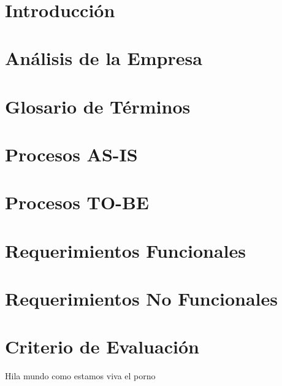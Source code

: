 \documentclass[10pt]{book}
\author{Cédula de Análisis de la OEDP}
\title{\varProyecto}
\subtitle {\varCveDocumento--\varDocumento}
\begin{document}
    \thispagestyle{empty}
    \maketitle

    \makeDocInfo
    \bigskip\\
    \makeObservaciones[3cm]
    \vspace{2cm}
    \makeFirmas

    \frontmatter
    \tableofcontents
    \listoffigures
    \mainmatter
    
    
    \chapter{Introducción}
    
    
    \chapter{Análisis de la Empresa}
    \label{ch:analisis}
    
    
  	\chapter{Glosario de Términos}
	\label{ch:glosario}
	
	
	\chapter{Procesos AS-IS}
	\label{ch:procesosasis}	
	
	
	
	\chapter{Procesos TO-BE}
	\label{ch:procesostobe}

	
	\chapter{Requerimientos Funcionales}
	\label{ch:reqFunc}
	
	\chapter{Requerimientos No Funcionales}	
	\label{ch:reqNoFunc}
	
	\chapter{Criterio de Evaluación} 
	\label{ch:criterio}
	
	
	Hila mundo como estamos viva el porno
	
 
    \clossing
    \cdtSaveData
\end{document}
